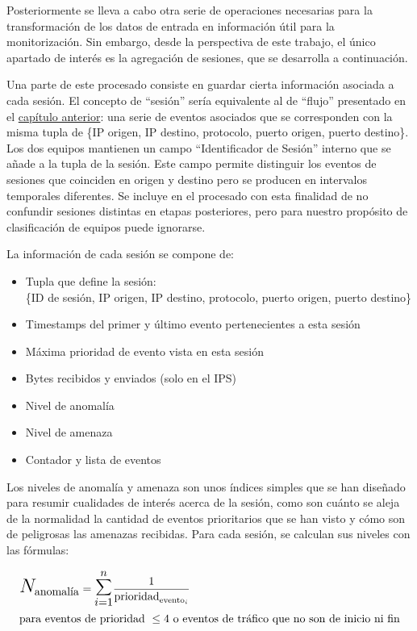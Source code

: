 Posteriormente se lleva a cabo otra serie de operaciones necesarias para la transformación de los datos de entrada en información útil para la monitorización.
Sin embargo, desde la perspectiva de este trabajo, el único apartado de interés es la agregación de sesiones, que se desarrolla a continuación.

Una parte de este procesado consiste en guardar cierta información asociada a cada sesión.
El concepto de ``sesión'' sería equivalente al de ``flujo'' presentado en el \hyperref[chap:estadodelarte]{capítulo anterior}:
una serie de eventos asociados que se corresponden con la misma tupla de \{IP origen, IP destino, protocolo, puerto origen, puerto destino\}.
Los dos equipos mantienen un campo ``Identificador de Sesión'' interno que se añade a la tupla de la sesión.
Este campo permite distinguir los eventos de sesiones que coinciden en origen y destino pero se producen en intervalos temporales diferentes.
Se incluye en el procesado con esta finalidad de no confundir sesiones distintas en etapas posteriores, pero para nuestro propósito de clasificación de equipos puede ignorarse.

La información de cada sesión se compone de:
\begin{itemize}
    \item Tupla que define la sesión:\\\{ID de sesión, IP origen, IP destino, protocolo, puerto origen, puerto destino\}
    \item Timestamps del primer y último evento pertenecientes a esta sesión
    \item Máxima prioridad de evento vista en esta sesión
    \item Bytes recibidos y enviados (solo en el IPS)
    \item Nivel de anomalía
    \item Nivel de amenaza
    \item Contador y lista de eventos
\end{itemize}

Los niveles de anomalía y amenaza son unos índices simples que se han diseñado para resumir cualidades de interés acerca de la sesión, como son
cuánto se aleja de la normalidad la cantidad de eventos prioritarios que se han visto y cómo son de peligrosas las amenazas recibidas.
Para cada sesión, se calculan sus niveles con las fórmulas:

\begin{eqnarray*}
    & \mathlarger{\mathlarger{\mathlarger{N}}}_{\textrm{anomalía}} = \mathlarger{\mathlarger{\mathlarger{\sum}}}_{i=1}^{n} \frac{1}{\textrm{prioridad}_{\textrm{evento}_i}}\\
    & \textrm{para eventos de prioridad }\leq4\textrm{ o eventos de tráfico que no son de inicio ni fin}
\end{eqnarray*}

